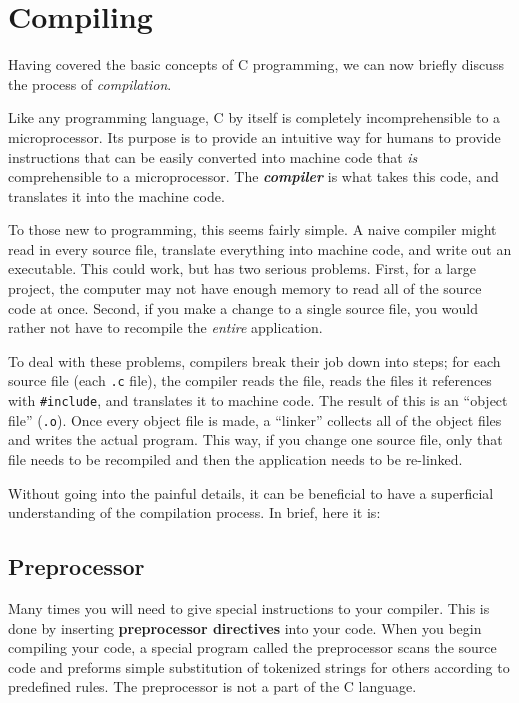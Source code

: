 \section{Compiling}
Having covered the basic concepts of C programming, we can now briefly discuss
the process of \emph{compilation}.

Like any programming language, C by itself is completely incomprehensible to a
microprocessor. Its purpose is to provide an intuitive way for humans to
provide instructions that can be easily converted into machine code that
\emph{is} comprehensible to a microprocessor. The \textbf{\emph{compiler}} is
what takes this code, and translates it into the machine code. 

To those new to programming, this seems fairly simple. A naive compiler might
read in every source file, translate everything into machine code, and write
out an executable. This could work, but has two serious problems. First, for a
large project, the computer may not have enough memory to read all of the
source code at once. Second, if you make a change to a single source file, you
would rather not have to recompile the \emph{entire} application. 

To deal with these problems, compilers break their job down into steps; for
each source file (each \texttt{.c} file), the compiler reads the file, reads
the files it references with \texttt{\#include}, and translates it to machine
code. The result of this is an ``object file'' (\texttt{.o}). Once every object
file is made, a ``linker'' collects all of the object files and writes the
actual program. This way, if you change one source file, only that file needs
to be recompiled and then the application needs to be re-linked. 

Without going into the painful details, it can be beneficial to have a
superficial understanding of the compilation process. In brief, here it is: 

\subsection{Preprocessor}
Many times you will need to give special instructions to your compiler. This is
done by inserting \textbf{preprocessor directives} into your code. When you
begin compiling your code, a special program called the preprocessor scans the
source code and preforms simple substitution of tokenized strings for others
according to predefined rules. The preprocessor is not a part of the C
language.

